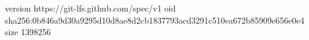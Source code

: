 version https://git-lfs.github.com/spec/v1
oid sha256:0b846a9d30a9295d10d8ae8d2cb1837793acd3291c510ea672b85909e656e0e4
size 1398256
